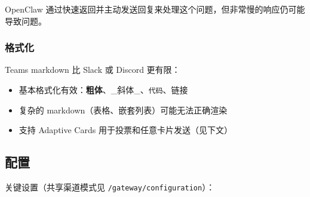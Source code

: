 OpenClaw 通过快速返回并主动发送回复来处理这个问题，但非常慢的响应仍可能导致问题。

\subsubsection{格式化}


Teams markdown 比 Slack 或 Discord 更有限：

\begin{itemize}
  \item 基本格式化有效：\textbf{粗体}、\_斜体\_、\texttt{代码}、链接
  \item 复杂的 markdown（表格、嵌套列表）可能无法正确渲染
  \item 支持 Adaptive Cards 用于投票和任意卡片发送（见下文）
\end{itemize}


\subsection{配置}


关键设置（共享渠道模式见 \texttt{/gateway/configuration}）：

